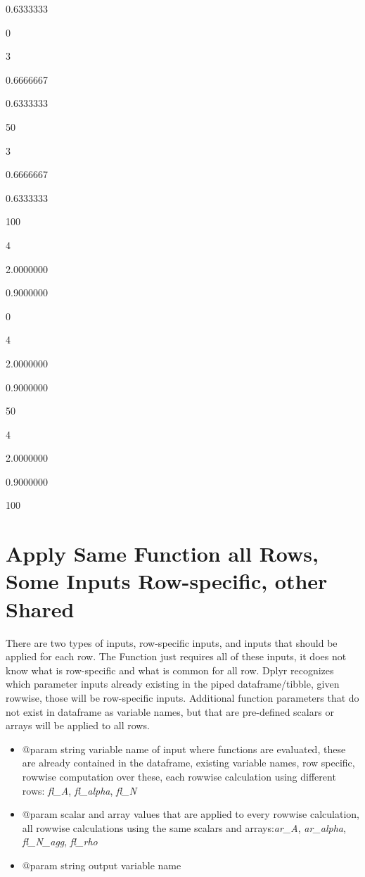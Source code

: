 \documentclass[]{article}
\providecommand{\tightlist}{%
  \setlength{\itemsep}{0pt}\setlength{\parskip}{0pt}}
\begin{document}
0.6333333

0

3

0.6666667

0.6333333

50

3

0.6666667

0.6333333

100

4

2.0000000

0.9000000

0

4

2.0000000

0.9000000

50

4

2.0000000

0.9000000

100

\hypertarget{apply-same-function-all-rows-some-inputs-row-specific-other-shared}{%
\section{Apply Same Function all Rows, Some Inputs Row-specific, other
Shared}\label{apply-same-function-all-rows-some-inputs-row-specific-other-shared}}

There are two types of inputs, row-specific inputs, and inputs that
should be applied for each row. The Function just requires all of these
inputs, it does not know what is row-specific and what is common for all
row. Dplyr recognizes which parameter inputs already existing in the
piped dataframe/tibble, given rowwise, those will be row-specific
inputs. Additional function parameters that do not exist in dataframe as
variable names, but that are pre-defined scalars or arrays will be
applied to all rows.

\begin{itemize}
\tightlist
\item
  @param string variable name of input where functions are evaluated,
  these are already contained in the dataframe, existing variable names,
  row specific, rowwise computation over these, each rowwise calculation
  using different rows: \emph{fl\_A}, \emph{fl\_alpha}, \emph{fl\_N}
\item
  @param scalar and array values that are applied to every rowwise
  calculation, all rowwise calculations using the same scalars and
  arrays:\emph{ar\_A}, \emph{ar\_alpha}, \emph{fl\_N\_agg},
  \emph{fl\_rho}
\item
  @param string output variable name
\end{itemize}
\end{document}
